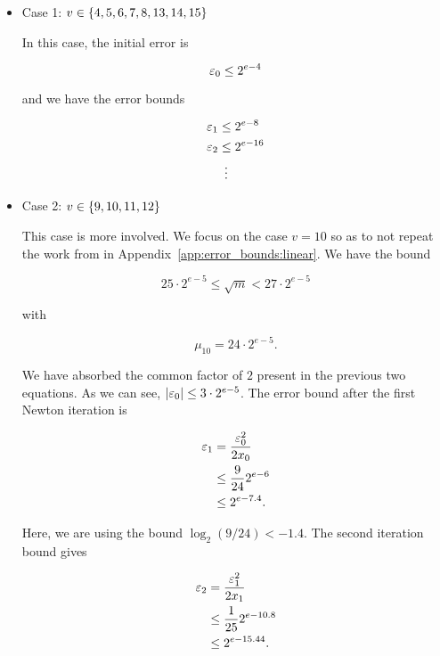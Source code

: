 \begin{itemize}
\item Case 1: $v\in\left\{ 4, 5, 6, 7, 8, 13, 14, 15 \right\}$

In this case, the initial error is

\begin{equation}
    \varepsilon_{0} \le 2^{e-4}
\end{equation}

\noindent
and we have the error bounds

\begin{align}
    \varepsilon_{1} &\le 2^{e-8} \nonumber\\
    \varepsilon_{2} &\le 2^{e-16} \nonumber\\
        &\ \vdots
\end{align}

\item Case 2: $v\in\left\{ 9, 10, 11, 12 \right\}$

This case is more involved.
We focus on the case $v=10$ so as to not repeat the work from
\Linear{} in Appendix~\ref{app:error_bounds:linear}.
We have the bound

\begin{equation}
    25\cdot2^{e-5} \le \sqrt{m} < 27\cdot2^{e-5}
    \label{eq:app_hyper_m_bound_v10}
\end{equation}

\noindent
with

\begin{equation}
    \mu_{10} = 24\cdot2^{e-5}.
\end{equation}

\noindent
We have absorbed the common factor of $2$ present
in the previous two equations.
As we can see, $\left| \varepsilon_{0} \right| \le 3\cdot2^{e-5}$.
The error bound after the first Newton iteration is

\begin{align}
    \varepsilon_{1} &= \frac{\varepsilon_{0}^{2}}{2x_{0}} \nonumber\\
        &\le \frac{9}{24}2^{e-6} \nonumber\\
        &\le 2^{e-7.4}.
\end{align}

\noindent
Here, we are using the bound $\log_{2}(9/24) < -1.4$.
The second iteration bound gives

\begin{align}
    \varepsilon_{2} &= \frac{\varepsilon_{1}^{2}}{2x_{1}} \nonumber\\
        &\le \frac{1}{25}2^{e-10.8} \nonumber\\
        &\le 2^{e-15.44}.
\end{align}


\end{itemize}
